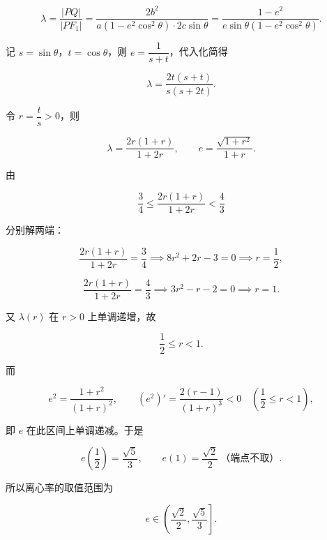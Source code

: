 \begin{answer}
\nopagebreak[4]
\[
\lambda=\frac{|PQ|}{|PF_{1}|}
=\frac{2b^{2}}{a(1-e^{2}\cos^{2}\theta)\cdot 2c\sin\theta}
=\frac{1-e^{2}}{e\sin\theta(1-e^{2}\cos^{2}\theta)}.
\]

记 $s=\sin\theta$，$t=\cos\theta$，则 $e=\dfrac{1}{s+t}$，代入化简得

\nopagebreak[4]
\[
\lambda=\frac{2t(s+t)}{s(s+2t)}.
\]

令 $r=\dfrac{t}{s}>0$，则

\nopagebreak[4]
\[
\lambda=\frac{2r(1+r)}{1+2r},\qquad
e=\frac{\sqrt{1+r^{2}}}{1+r}.
\]

由

\nopagebreak[4]
\[
\frac{3}{4}\le\frac{2r(1+r)}{1+2r}<\frac{4}{3}
\]

分别解两端：

\nopagebreak[4]
\[
\frac{2r(1+r)}{1+2r}=\frac{3}{4}
\implies
8r^{2}+2r-3=0
\implies
r=\frac{1}{2},
\]

\nopagebreak[4]
\[
\frac{2r(1+r)}{1+2r}=\frac{4}{3}
\implies
3r^{2}-r-2=0
\implies
r=1.
\]

又 $\lambda(r)$ 在 $r>0$ 上单调递增，故

\nopagebreak[4]
\[
\frac{1}{2}\le r<1.
\]

而

\nopagebreak[4]
\[
e^{2}=\frac{1+r^{2}}{(1+r)^{2}},
\qquad
\left(e^{2}\right)'=\frac{2(r-1)}{(1+r)^{3}}<0\quad\left(\frac{1}{2}\le r<1\right),
\]

即 $e$ 在此区间上单调递减。于是

\nopagebreak[4]
\[
e\left(\frac{1}{2}\right)=\frac{\sqrt{5}}{3},\qquad
e(1)=\frac{\sqrt{2}}{2}\ \text{（端点不取）}.
\]

所以离心率的取值范围为

\nopagebreak[4]
\[
e\in\left(\frac{\sqrt{2}}{2},\frac{\sqrt{5}}{3}\right].
\]


\gkanswer{答案（2）：$e\in\left(\dfrac{\sqrt{2}}{2},\dfrac{\sqrt{5}}{3}\right]$。}

\end{answer}